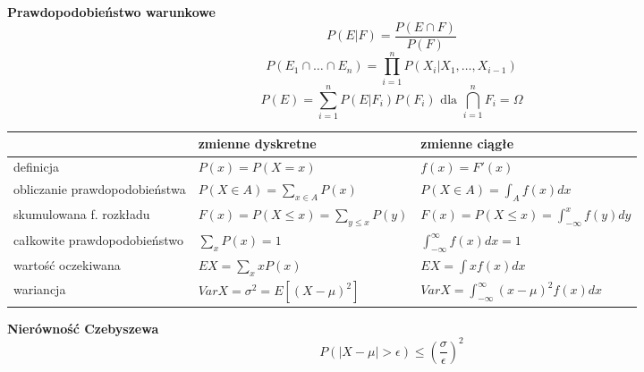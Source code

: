 \documentclass[a4paper]{article}
\begin{document}
    \textbf{Prawdopodobieństwo warunkowe}
    \begin{equation}
        P(E|F) = \frac{P(E \cap F)}{P(F)}
    \end{equation}
    \begin{equation}
        P(E_1 \cap \dots \cap E_n) = \prod_{i=1}^{n} P(X_i | X_1, \dots, X_{i-1})
    \end{equation}
    \begin{equation}
        P(E) = \sum_{i=1}^{n} P(E|F_i)P(F_i) \text{ dla } \bigcap_{i=1}^{n} F_i = \Omega
    \end{equation}

    \begin{table}[H]
        \begin{center}
            \begin{tabular}{ p{5cm} | p{5cm} p{5.5cm} }
                & zmienne dyskretne & zmienne ciągłe\\
                \toprule
                definicja & $P(x) = P(X=x)$ & $f(x) = F'(x)$\\
                obliczanie prawdopodobieństwa & $P(X \in A) = \sum_{x \in A} P(x)$ & $P(X \in A) = \int_{A} f(x)dx$\\
                skumulowana f. rozkładu & $F(x) = P(X \leq x) = \sum_{y \leq x}P(y)$ &
                $F(x) = P(X \leq x) = \int_{-\infty}^{x}f(y)dy$\\
                całkowite prawdopodobieństwo & $\sum_{x}P(x) = 1$ & $\int_{- \infty}^{\infty}f(x)dx = 1$\\
                wartość oczekiwana & $EX = \sum_{x} x P(x)$ & $EX = \int xf(x) dx$\\
                wariancja & $VarX = \sigma^2 = E[ (X - \mu)^2 ]$ & $VarX = \int_{- \infty}^{\infty} (x - \mu)^2 f(x) dx$\\
                \bottomrule
            \end{tabular}
        \end{center}
    \end{table}

    \textbf{Nierówność Czebyszewa}
    \begin{equation}
        P( |X - \mu| > \epsilon ) \leq (\frac{\sigma}{\epsilon})^2
    \end{equation}
\end{document}
